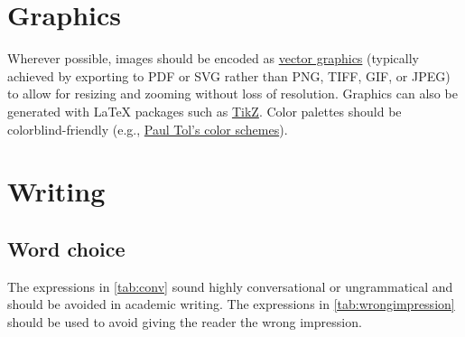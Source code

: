 \section{Graphics}


Wherever possible, images should be encoded as \href{https://simple.wikipedia.org/wiki/Vector_graphics}{vector graphics}
(typically achieved by exporting to PDF or SVG rather than PNG, TIFF, GIF, or JPEG) to allow for resizing and zooming without loss of resolution.
Graphics can also be generated with \LaTeX{} packages such as \href{https://en.wikibooks.org/wiki/LaTeX/PGF/TikZ}{TikZ}.
Color palettes should be colorblind-friendly (e.g., \href{https://personal.sron.nl/~pault/data/colourschemes.pdf}{Paul Tol's color schemes}).

\section{Writing}

\subsection{Word choice}

The expressions in \cref{tab:conv} sound highly conversational or ungrammatical and should be avoided in academic writing.
The expressions in \cref{tab:wrongimpression} should be used to avoid giving the reader the wrong impression.

